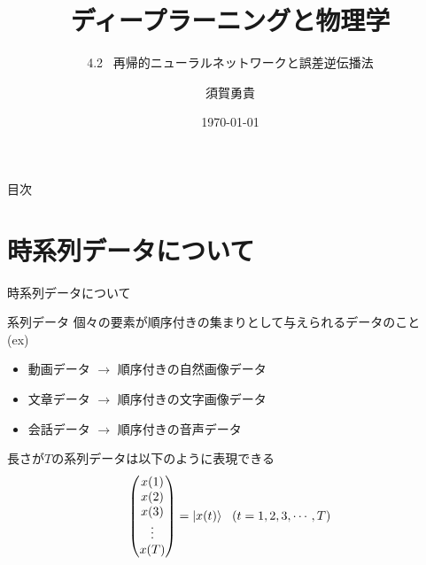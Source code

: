 \documentclass[dvipdfmx,10pt]{beamer}
\title{ディープラーニングと物理学}
\subtitle{4.2 \ 再帰的ニューラルネットワークと誤差逆伝播法}
\author[須賀]{須賀勇貴}
\institute[茨大]{茨城大学大学院 \ 理工学研究科 \ 量子線科学専攻 \ 2年}
\date{\today}
\begin{document}
\frame{\maketitle}

  \begin{frame}{目次}
    \tableofcontents  %
  \end{frame}

  \section{時系列データについて}
  \begin{frame}{時系列データについて}
    \begin{block}{系列データ}
      個々の要素が順序付きの集まりとして与えられるデータのこと\\
      (ex) 
      \begin{itemize}
        \item 動画データ $\rightarrow$ 順序付きの自然画像データ
        \item 文章データ $\rightarrow$ 順序付きの文字画像データ
        \item 会話データ $\rightarrow$ 順序付きの音声データ
      \end{itemize}
    \end{block}
    長さが$T$の系列データは以下のように表現できる
      \begin{equation*}
        \begin{pmatrix*}
          x(1) \\ x(2) \\ x(3) \\ \vdots \\ x(T)
        \end{pmatrix*}
        =\ket{x(t)} \ \ (t=1,2,3,\cdots,T)
      \end{equation*}  
  \end{frame}
\end{document}
